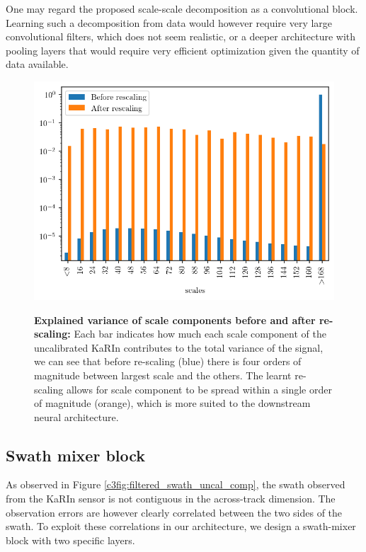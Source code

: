 \begin{bibunit}
One may regard the proposed scale-scale decomposition as a convolutional block. Learning such a decomposition from data would however require very large convolutional filters, which does not seem 
realistic, or a deeper architecture with pooling layers that would require very efficient optimization given the quantity of data available. 
\begin{figure}[!t]%
    \centering
    {\includegraphics[width=\linewidth]{00_Calib/var_rescale_obs} }%
    \caption{\textbf{Explained variance of scale components before and after re-scaling:} Each bar indicates how much each scale component of the uncalibrated KaRIn contributes to the total variance of the signal, we can see that before re-scaling (blue) there is four orders of magnitude between largest scale and the others. The learnt re-scaling allows for scale component to be spread within a single order of magnitude (orange), which is more suited to the downstream neural architecture.}%
    \label{c3fig:var_in_out}%
\end{figure}


\subsection{Swath mixer block}
\label{c3subsec:mixing}

As observed in Figure \ref{c3fig:filtered_swath_uncal_comp}, the swath observed from the KaRIn sensor is not contiguous in the across-track dimension. The observation errors are however clearly correlated between the two sides of the swath. To exploit these correlations in our architecture, we design a swath-mixer block with two specific layers. 


\end{bibunit}
